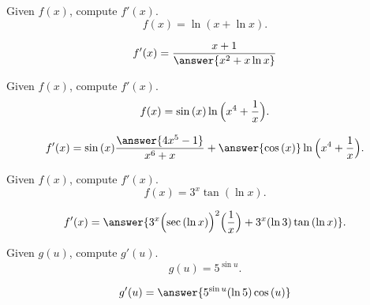 \documentclass{ximera}
\author{Nela Lakos}
\begin{document}
\begin{exercise}
Given $f(x)$, compute $f'(x)$.
\[
f(x) = \ln{(x+\ln{x})}.
\]
\begin{prompt}
\[
f'(x) =\dfrac{x+1}{ \answer{x^2 +x\ln{x}}}
\]
\end{prompt}
\end{exercise}
\begin{exercise}
Given $f(x)$, compute $f'(x)$.
\[
f(x) = \sin{(x)}\ln{\Bigl(x^4+\frac{1}{x}\Bigr)}.
\]
\begin{prompt}
\[
f'(x) = \sin{(x)}\frac{\answer{4x^5-1}}{{x^6+x}}+\answer{ \cos{(x)}}\ln{\Bigl(x^4+\frac{1}{x}\Bigr)}.
\]
\end{prompt}
\end{exercise}
\begin{exercise}
Given $f(x)$, compute $f'(x)$.
\[
f(x) = 3^{x}\tan{(\ln{x})}.
\]
\begin{prompt}
\[
f'(x) =\answer{3^{x}\Bigl(\sec{(\ln{x})}\Bigr)^{2}\Bigl(\frac{1}{x}\Bigr)+3^{x}(\ln{3})\tan{(\ln{x})}}.
\]
\end{prompt}
\end{exercise}

\begin{exercise}
Given $g(u)$, compute $g'(u)$.
\[
g(u) =5^{\sin{u}}.
\]
\begin{prompt}
\[
g'(u) =\answer{ 5^{\sin{u}}(\ln{5})\cos{(u)}}
\]
\end{prompt}
\end{exercise}
\end{document}
